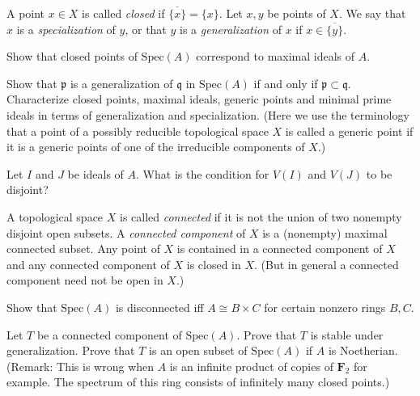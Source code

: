 \begin{definition}
\label{definition-closed}
A point $x\in X$ is called {\it closed} if $\overline{\{x\}} = \{ x\}$.
Let $x, y$ be points of $X$. We say that $x$ is a {\it specialization}
of $y$, or that $y$ is a {\it generalization} of $x$ if
$x\in \overline{\{y\}}$.
\end{definition}

\begin{exercise}
\label{exercise-closed-maximal}
Show that closed points of $\text{Spec}(A)$
correspond to maximal ideals of $A$.
\end{exercise}

\begin{exercise}
\label{exercise-generalization}
Show that ${\mathfrak p}$ is a generalization of ${\mathfrak q}$
in $\text{Spec}(A)$ if and only if ${\mathfrak p}\subset {\mathfrak q}$.
Characterize closed points,
maximal ideals, generic points and minimal prime ideals in terms of
generalization and specialization. (Here we use the terminology that a point
of a possibly reducible topological space $X$ is called a generic point
if it is a generic points of one of the irreducible components of $X$.)
\end{exercise}

\begin{exercise}
\label{exercise-disjoint-closed-spec}
Let $I$ and $J$ be ideals of $A$.
What is the condition for $V(I)$ and $V(J)$ to be disjoint?
\end{exercise}

\begin{definition}
\label{definition-connected-component}
A topological space $X$ is called {\it connected} if it is not the union
of two nonempty disjoint open subsets. A {\it connected component}
of $X$ is a (nonempty) maximal connected subset. Any point of $X$ is contained
in a connected component of $X$ and any connected component of $X$ is
closed in $X$. (But in general a connected component need not be open in $X$.)
\end{definition}

\begin{exercise}
\label{exercise-disconnnected-spec}
Show that $\text{Spec}(A)$ is disconnected
iff $A\cong B\times C$ for certain nonzero rings $B, C$.
\end{exercise}

\begin{exercise}
\label{exercise-connected-component-stable-generalization}
Let $T$ be a connected component
of $\text{Spec}(A)$. Prove that $T$ is stable under generalization.
Prove that $T$ is an open subset of $\text{Spec}(A)$ if $A$ is Noetherian.
(Remark: This is wrong when $A$ is an infinite product of copies of
${\mathbf F}_2$ for example. The spectrum of this ring consists of infinitely
many closed points.)
\end{exercise}

